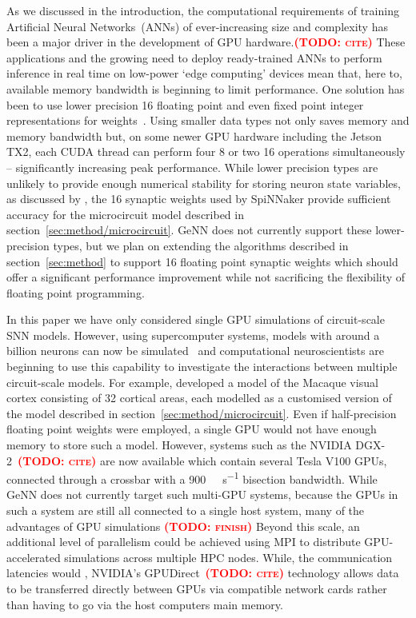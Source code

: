 \documentclass[utf8]{frontiersSCNS} %
\newcommand{\todo}[1]{\textbf{\textsc{\textcolor{red}{(TODO: #1)}}}}
\begin{document}
As we discussed in the introduction, the computational requirements of training Artificial Neural Networks~(ANNs) of ever-increasing size and complexity has been a major driver in the development of GPU hardware.\todo{cite}
These applications and the growing need to deploy ready-trained ANNs to perform inference in real time on low-power `edge computing' devices mean that, here to, available memory bandwidth is beginning to limit performance.
One solution has been to use lower precision \SI{16}{\bit} floating point and even fixed point integer representations for weights~\citep{Micikevicius2017}.
Using smaller data types not only saves memory and memory bandwidth but, on some newer GPU hardware including the Jetson TX2, each CUDA thread can perform four \SI{8}{\bit} or two \SI{16}{\bit} operations simultaneously -- significantly increasing peak performance.
While lower precision types are unlikely to provide enough numerical stability for storing neuron state variables, as discussed by \citet{VanAlbada2018}, the \SI{16}{\bit} synaptic weights used by SpiNNaker provide sufficient accuracy for the microcircuit model described in section~\ref{sec:method/microcircuit}.
GeNN does not currently support these lower-precision types, but we plan on extending the algorithms described in section~\ref{sec:method} to support \SI{16}{\bit} floating point synaptic weights which should offer a significant performance improvement while not sacrificing the flexibility of floating point programming.

In this paper we have only considered single GPU simulations of circuit-scale SNN models.
However, using supercomputer systems, models with around a billion neurons can now be simulated~\citep{Jordan2018} and computational neuroscientists are beginning to use this capability to investigate the interactions between multiple circuit-scale models.
For example, \citet{Schmidt2015} developed a model of the Macaque visual cortex consisting of 32 cortical areas, each modelled as a customised version of the model described in section~\ref{sec:method/microcircuit}.
Even if half-precision floating point weights were employed, a single GPU would not have enough memory to store such a model.
However, systems such as the NVIDIA DGX-2~\todo{cite} are now available which contain several Tesla V100 GPUs, connected through a crossbar with a \SI{900}{\giga\byte\per\second} bisection bandwidth.
While GeNN does not currently target such multi-GPU systems, because the GPUs in such a system are still all connected to a single host system, many of the advantages of GPU simulations \todo{finish}
Beyond this scale, an additional level of parallelism could be achieved using MPI to distribute GPU-accelerated simulations across multiple HPC nodes.
While, the communication latencies would , NVIDIA's GPUDirect~\todo{cite} technology allows data to be transferred directly between GPUs via compatible network cards rather than having to go via the host computers main memory.
\end{document}
